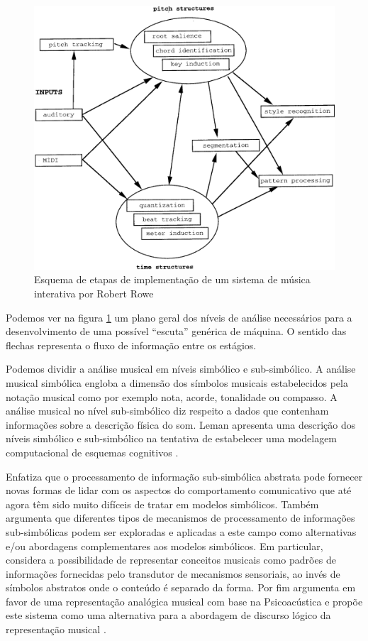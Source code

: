 \documentclass{ppgmus}
\begin{document}
\begin{figure}
\includegraphics[scale=.25]{rowe}
\caption{Esquema de etapas de implementação de um sistema de música interativa por Robert Rowe}
\label{rowe}
\end{figure} 


Podemos ver na figura \ref{rowe} um plano geral dos níveis de análise necessários para a desenvolvimento
de uma possível ``escuta'' genérica de máquina. O sentido das flechas representa o fluxo de 
informação entre os estágios.


Podemos dividir a análise musical em níveis simbólico e sub-simbólico.
A análise musical simbólica engloba a dimensão dos símbolos musicais
estabelecidos pela notação musical como por exemplo nota, acorde, tonalidade ou compasso.
A análise musical no nível sub-simbólico diz respeito a dados que contenham informações sobre a 
descrição física do som. Leman apresenta uma descrição dos níveis simbólico e sub-simbólico 
na tentativa de estabelecer uma modelagem
computacional de esquemas cognitivos \cite{leman89}.

Enfatiza que o processamento de informação sub-simbólica abstrata pode fornecer novas formas de lidar com os aspectos
do comportamento comunicativo que até agora têm sido muito difíceis de tratar em modelos simbólicos.
Também argumenta que diferentes tipos de mecanismos de processamento de informações sub-simbólicas podem ser exploradas
e aplicadas a este campo como alternativas e/ou abordagens complementares aos modelos simbólicos.
Em particular, considera a possibilidade de representar conceitos musicais como padrões de
informações fornecidas pelo transdutor de mecanismos sensoriais, ao invés de símbolos abstratos onde o conteúdo
é separado da forma. Por fim argumenta em favor de uma representação analógica musical
com base na Psicoacústica e propõe este sistema como uma alternativa para a abordagem de discurso lógico da representação musical \cite{leman89}.
\end{document}
